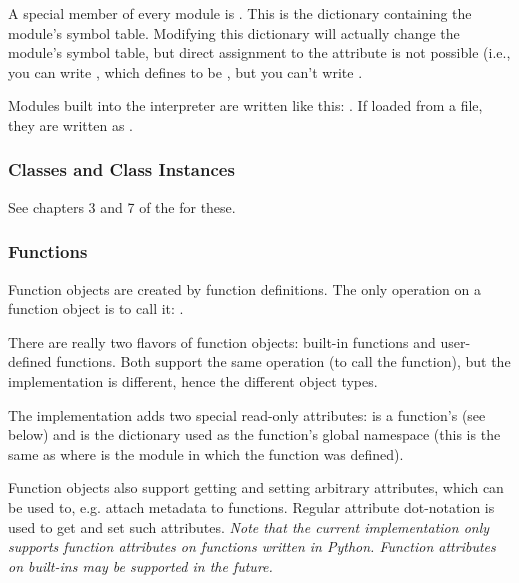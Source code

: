A special member of every module is .
This is the dictionary containing the module's symbol table.
Modifying this dictionary will actually change the module's symbol
table, but direct assignment to the  attribute is not
possible (i.e., you can write , which
defines  to be , but you can't write
.

Modules built into the interpreter are written like this:
.  If loaded from a file, they are
written as .


\subsubsection{Classes and Class Instances \label{typesobjects}}

See chapters 3 and 7 of the  for these.


\subsubsection{Functions \label{typesfunctions}}

Function objects are created by function definitions.  The only
operation on a function object is to call it:
.

There are really two flavors of function objects: built-in functions
and user-defined functions.  Both support the same operation (to call
the function), but the implementation is different, hence the
different object types.

The implementation adds two special read-only attributes:
 is a function's  (see below) and  is
the dictionary used as the function's global namespace (this is the
same as  where  is the module in which
the function  was defined).

Function objects also support getting and setting arbitrary
attributes, which can be used to, e.g. attach metadata to functions.
Regular attribute dot-notation is used to get and set such
attributes. \emph{Note that the current implementation only supports
function attributes on functions written in Python.  Function
attributes on built-ins may be supported in the future.}

